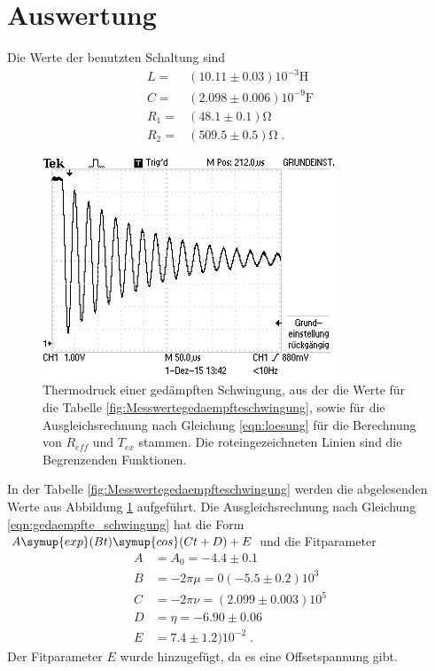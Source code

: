 \section{Auswertung}
\label{sec:Auswertung}
Die Werte der benutzten Schaltung sind
\begin{align*}
  L=&(10.11\pm0.03)10^{-3}\si{\henry}\\
  C=&(2.098\pm0.006)10^{-9}\si{\farad}\\
  R_1=&(48.1\pm0.1)\si{\ohm}\\
  R_2=&(509.5\pm0.5)\si{\ohm}\;.
\end{align*}
\begin{figure}
  \centering
  \includegraphics[width=0.78\textwidth]{Thermodruck.JPG}
  \caption{Thermodruck einer gedämpften Schwingung, aus der die Werte für
  die Tabelle \ref{fig:Messwertegedaempfteschwingung}, sowie für die Ausgleichsrechnung
  nach Gleichung \eqref{eqn:loesung} für die Berechnung von $R_{eff}$ und $T_{ex}$
  stammen. Die roteingezeichneten Linien sind die Begrenzenden Funktionen.}
  \label{fig:termodruck}
\end{figure}
In der Tabelle \ref{fig:Messwertegedaempfteschwingung} werden die
abgelesenden Werte aus Abbildung \ref{fig:termodruck}
aufgeführt. Die Ausgleichsrechnung nach Gleichung
\eqref{eqn:gedaempfte_schwingung} hat die Form $A\symup{exp}(Bt)\symup{cos}(Ct+D)+E$
und die Fitparameter
\begin{align*}
  A&=A_0=-4.4\pm0.1  \\
  B&=-2\pi\mu=0(-5.5\pm0.2)10^3  \\
  C&=-2\pi\nu=(2.099\pm0.003)10^5   \\
  D&=\eta=-6.90\pm0.06  \\
  E&=7.4\pm1.2)10^{-2}\;.
\end{align*}
Der Fitparameter $E$ wurde hinzugefügt, da es eine Offsetspannung gibt.
